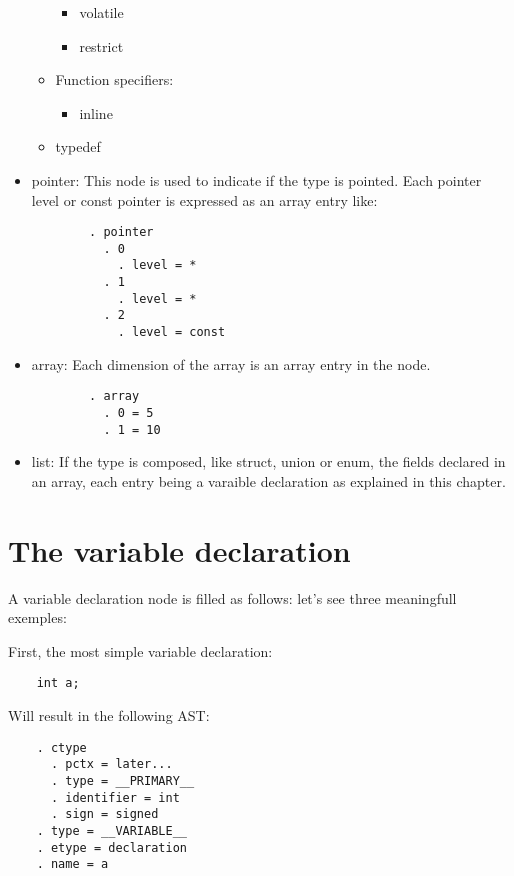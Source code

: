 \documentclass[a4paper,11pt]{report}
\begin{document}
\begin{itemize}
\begin{itemize}
\begin{itemize}
            \item volatile
            \item restrict
          \end{itemize}
        \item Function specifiers:
          \begin{itemize}
            \item inline
          \end{itemize}
        \item typedef
      \end{itemize}
    \item pointer: This node is used to indicate if the type is pointed. Each
      pointer level or const pointer is expressed as an array entry like:
      \begin{lstlisting}
        . pointer
          . 0
            . level = *
          . 1
            . level = *
          . 2
            . level = const
      \end{lstlisting}
    \item array: Each dimension of the array is an array entry in the node.
      \begin{lstlisting}
        . array
          . 0 = 5
          . 1 = 10
      \end{lstlisting}
    \item list: If the type is composed, like struct, union or enum, the
      fields declared in an array, each entry being a varaible declaration
      as explained in this chapter.
  \end{itemize}

  \section{The variable declaration}

  A variable declaration node is filled as follows:
  let's see three meaningfull exemples:

  First, the most simple variable declaration:
  \begin{lstlisting}
    int a;
  \end{lstlisting}
  
  Will result in the following AST:
  \begin{lstlisting}
    . ctype
      . pctx = later...
      . type = __PRIMARY__
      . identifier = int
      . sign = signed
    . type = __VARIABLE__
    . etype = declaration
    . name = a
  \end{lstlisting}
\end{document}
